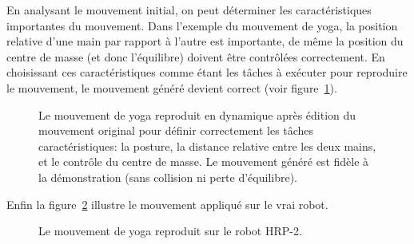En analysant le mouvement initial, on peut déterminer les caractéristiques importantes 
du mouvement. Dans l'exemple du mouvement de yoga, la position relative d'une main par rapport à l'autre
est importante, de même la position du centre de masse (et donc l'équilibre) doivent être contrôlées correctement.
En choisissant ces caractéristiques comme étant les t\^aches à exécuter pour reproduire le mouvement,
le mouvement généré devient correct (voir figure~\ref{fig:yogaDyn}).
\begin{figure}[t]
  \begin{center}
  \end{center}
  \caption[Mouvement de yoga valide en dynamique.]{Le mouvement de yoga reproduit en dynamique après édition du mouvement
  original pour définir correctement les t\^aches caractéristiques: la posture, la distance relative entre les
  deux mains, et le contrôle du centre de masse. Le mouvement généré est fidèle à la démonstration (sans collision ni
  perte d'équilibre).}
  \label{fig:yogaDyn}
\end{figure}
Enfin la figure~\ref{fig:yogaR} illustre le mouvement appliqué sur le vrai robot.
\begin{figure}[t]
  \begin{center}
  \end{center}
  \caption[Mouvement de yoga sur le robot.]{Le mouvement de yoga reproduit sur le robot HRP-2.}
  \label{fig:yogaR}
\end{figure}

\FloatBarrier
